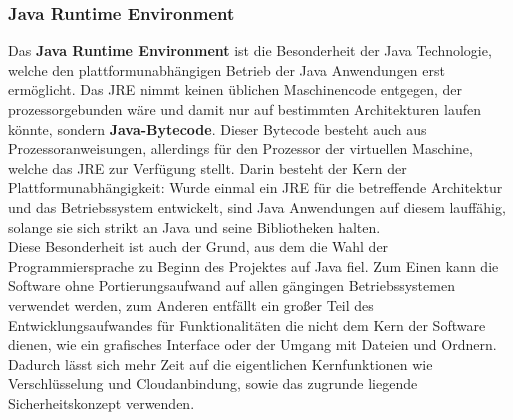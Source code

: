 \documentclass[13pt,a4paper,bibliography=totocnumbered,listof=totocnumbered]{scrartcl}
\begin{document}
\subsubsection{Java Runtime Environment}
Das \textbf{Java Runtime Environment} ist die Besonderheit der Java Technologie, welche den plattformunabhängigen Betrieb der Java Anwendungen erst ermöglicht. Das  JRE nimmt keinen üblichen Maschinencode entgegen, der prozessorgebunden wäre und damit nur auf bestimmten Architekturen laufen könnte, sondern \textbf{Java-Bytecode}. Dieser Bytecode besteht auch aus Prozessoranweisungen, allerdings für den Prozessor der virtuellen Maschine, welche das JRE zur Verfügung stellt. Darin besteht der Kern der Plattformunabhängigkeit: Wurde einmal ein JRE für die betreffende Architektur und das Betriebssystem entwickelt, sind Java Anwendungen auf diesem lauffähig, solange sie sich strikt an Java und seine Bibliotheken halten.\\
Diese Besonderheit ist auch der Grund, aus dem die Wahl der Programmiersprache zu Beginn des Projektes auf Java fiel. Zum Einen kann die Software ohne Portierungsaufwand auf allen gängingen Betriebssystemen verwendet werden, zum Anderen entfällt ein großer Teil des Entwicklungsaufwandes für Funktionalitäten die nicht dem Kern der Software dienen, wie ein grafisches Interface oder der Umgang mit Dateien und Ordnern. Dadurch lässt sich mehr Zeit auf die eigentlichen Kernfunktionen wie Verschlüsselung und Cloudanbindung,  sowie das zugrunde liegende Sicherheitskonzept verwenden. \\\cite{1}\cite{2}\cite{3}
\end{document}
